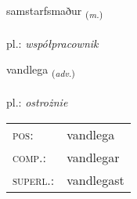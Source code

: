 \documentclass[frontgrid, backgrid]{flacards}\usepackage[]{graphicx}\usepackage[]{xcolor}
\begin{document}
\renewcommand{\flhead}{\vskip5pt \fboxsep=0pt {\small\bfseries\footnotesize Nafnorð | rzeczownik}}
\renewcommand{\fcfoot}{\vskip5pt \fboxsep=0pt \hspace{2pt}{\small\bfseries\footnotesize 3K}}

\renewcommand{\blhead}{\vskip5pt {\small\bfseries\footnotesize Nafnorð | rzeczownik }}
\renewcommand{\bcfoot}{\vskip5pt \hspace{2pt}{\small\bfseries\footnotesize 3K}}


{samstarfsmaður \small{\textsubscript{(\textit{m.})}} \\[1ex] %
\textphonetic{[samstarfsmaðʏr]} \\
pl.: \emph{współpracownik} \\  [2ex]
\renewcommand*{\arraystretch}{0.8}
}

\renewcommand{\flhead}{\vskip5pt \fboxsep=0pt {\small\bfseries\footnotesize Atviksorð | przysłówek}}
\renewcommand{\fcfoot}{\vskip5pt \fboxsep=0pt \hspace{2pt}{\small\bfseries\footnotesize 3K}}

\renewcommand{\blhead}{\vskip5pt {\small\bfseries\footnotesize Atviksorð | przysłówek }}
\renewcommand{\bcfoot}{\vskip5pt \hspace{2pt}{\small\bfseries\footnotesize 3K}}


{vandlega \small{\textsubscript{(\textit{adv.})}} \\[1ex] %
\textphonetic{[vantlɛɣa]} \\
pl.: \emph{ostrożnie} \\  [2ex]
\renewcommand*{\arraystretch}{0.8}
\begin{tabular}{ll}
\textsc{pos}: & vandlega \\ 
\textsc{comp.}: & vandlegar \\ 
\textsc{superl.}: & vandlegast \\
\end{tabular}
}
\end{document}
